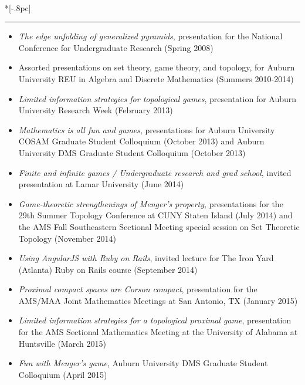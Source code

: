 \documentclass{article}
\newcommand{\headerText}[1]{
  \noindent{\large \bf #1} \\*[-.8pc]
  \rule{\textwidth}{.1pt}}
\begin{document}
\headerText{Presentations}
\begin{itemize}
  \item
    \emph{The edge unfolding of generalized pyramids},
    presentation for the National Conference for Undergraduate Research
      (Spring 2008)
  \item
    Assorted presentations on set theory, game theory, and topology,
    for Auburn University REU in Algebra and Discrete Mathematics
      (Summers 2010-2014)
  \item
    \emph{Limited information strategies for topological games},
    presentation for Auburn University Research Week (February 2013)
  \item
    \emph{Mathematics is all fun and games},
    presentations for
      Auburn University COSAM Graduate Student Colloquium (October 2013) and
      Auburn University DMS Graduate Student Colloquium (October 2013)
  \item
    \emph{Finite and infinite games / Undergraduate research and grad school},
    invited presentation at Lamar University (June 2014)
  \item
    \emph{Game-theoretic strengthenings of Menger's property},
    presentations for
      the 29th Summer Topology Conference at CUNY Staten Island (July 2014) and
      the AMS Fall Southeastern Sectional Meeting special session on Set
      Theoretic Topology (November 2014)
  \item
    \emph{Using AngularJS with Ruby on Rails},
    invited lecture for The Iron Yard (Atlanta) Ruby on Rails course
      (September 2014)
  \item
    \emph{Proximal compact spaces are Corson compact},
    presentation for the AMS/MAA Joint Mathematics Meetings at San Antonio, TX
      (January 2015)
  \item
    \emph{Limited information strategies for a topological proximal game},
    presentation for the AMS Sectional Mathematics Meeting at the University of
    Alabama at Huntsville
      (March 2015)
  \item
    \emph{Fun with Menger's game},
      Auburn University DMS Graduate Student Colloquium
        (April 2015)
\end{itemize}


\vfill
\end{document}
